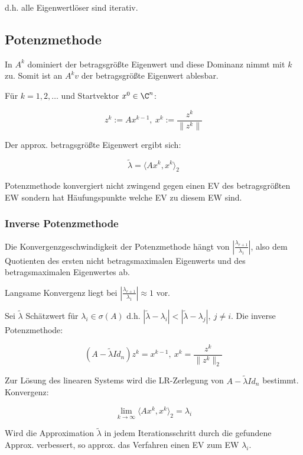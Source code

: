 d.h. alle Eigenwertlöser sind iterativ.

\subsection*{Potenzmethode}

In $A^k$ dominiert der betragsgrößte Eigenwert und diese Dominanz nimmt mit $k$ zu. Somit ist an $A^k v$ der betragsgrößte Eigenwert ablesbar.

Für $k = 1, 2, \dots$ und Startvektor $x^0 \in \C^n$:

\vspace*{-2mm}
$$z^k := Ax^{k-1}, \ x^k := \frac{z^k}{\|z^k\|}$$

Der approx. betragsgrößte Eigenwert ergibt sich:

\vspace*{-2mm}
$$\tilde\lambda = \langle Ax^k,x^k \rangle_2$$

Potenzmethode konvergiert nicht zwingend gegen einen EV des betragsgrößten EW sondern hat Häufungspunkte welche EV zu diesem EW sind.

\subsubsection*{Inverse Potenzmethode}

Die Konvergenzgeschwindigkeit der Potenzmethode hängt von $|\frac{\lambda_{r+1}}{\lambda_1}|$, also dem Quotienten des ersten nicht betragsmaximalen Eigenwerts und des betragsmaximalen Eigenwertes ab.

Langsame Konvergenz liegt bei $|\frac{\lambda_{r+1}}{\lambda_1}| \approx 1$ vor.

\spacing

Sei $\tilde\lambda$ Schätzwert für $\lambda_i \in \sigma(A)$ d.h. $|\tilde\lambda - \lambda_i| < |\tilde\lambda - \lambda_j|, \ j \neq i$. Die inverse Potenzmethode:

\vspace*{-2mm}
$$(A-\tilde\lambda Id_n)z^k = x^{k-1}, \ x^k = \frac{z^k}{\|z^k\|_2}$$

Zur Lösung des linearen Systems wird die LR-Zerlegung von $A- \tilde\lambda Id_n$ bestimmt. Konvergenz:

\vspace*{-2mm}
$$\lim_{k\to\infty} \langle Ax^k,x^k \rangle_2 = \lambda_i$$

Wird die Approximation $\tilde\lambda$ in jedem Iterationsschritt durch die gefundene Approx. verbessert, so approx. das Verfahren einen EV zum EW $\lambda_i$.

